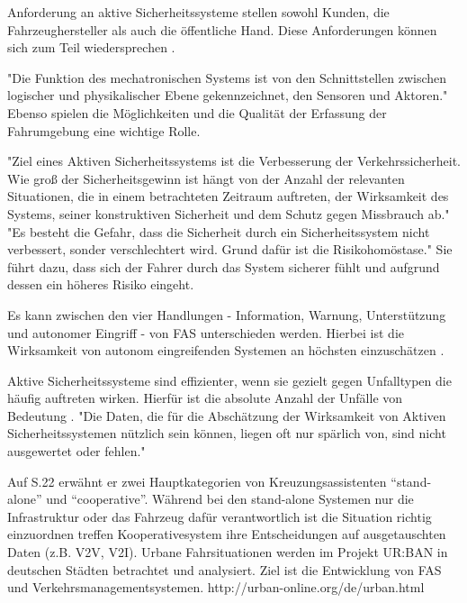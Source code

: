 
Anforderung an aktive Sicherheitssysteme stellen sowohl Kunden, die Fahrzeughersteller als auch die öffentliche Hand. Diese Anforderungen können sich zum Teil wiedersprechen \parencite[S.8]{Meitinger.2008}. %

"Die Funktion des mechatronischen Systems ist von den Schnittstellen zwischen logischer und physikalischer Ebene gekennzeichnet, den Sensoren und Aktoren." \parencite[S.9]{Meitinger.2008} Ebenso spielen die Möglichkeiten und die Qualität der Erfassung der Fahrumgebung eine wichtige Rolle.

"Ziel eines Aktiven Sicherheitssystems ist die Verbesserung der Verkehrssicherheit. Wie groß der Sicherheitsgewinn ist hängt von der Anzahl der relevanten Situationen, die in einem betrachteten Zeitraum auftreten, der Wirksamkeit des Systems, seiner konstruktiven Sicherheit und dem Schutz gegen Missbrauch ab." "Es besteht die Gefahr, dass die Sicherheit durch ein Sicherheitssystem nicht verbessert, sonder verschlechtert wird. Grund dafür ist die Risikohomöstase." Sie führt dazu, dass sich der Fahrer durch das System sicherer fühlt und aufgrund dessen ein höheres Risiko eingeht. \parencite[S.10]{Meitinger.2008}

Es kann zwischen den vier Handlungen - Information, Warnung, Unterstützung und autonomer Eingriff - von FAS unterschieden werden. Hierbei ist die Wirksamkeit von autonom eingreifenden Systemen an höchsten einzuschätzen \parencite[S.11]{Meitinger.2008}.

Aktive Sicherheitssysteme sind effizienter, wenn sie gezielt gegen Unfalltypen die  häufig auftreten wirken. Hierfür ist die absolute Anzahl der Unfälle von Bedeutung \parencite[S.19]{Meitinger.2008}. "Die Daten, die für die Abschätzung der Wirksamkeit von Aktiven Sicherheitssystemen nützlich sein können, liegen oft nur spärlich von, sind nicht ausgewertet oder fehlen." \parencite[S.22]{Meitinger.2008}

Auf S.22 erwähnt er zwei Hauptkategorien von Kreuzungsassistenten \enquote{stand-alone} und \enquote{cooperative}. Während bei den stand-alone Systemen nur die Infrastruktur oder das Fahrzeug dafür verantwortlich ist die Situation richtig einzuordnen treffen Kooperativesystem ihre Entscheidungen auf ausgetauschten Daten (z.B. V2V, V2I).
Urbane Fahrsituationen werden im Projekt UR:BAN in deutschen Städten betrachtet und analysiert. Ziel ist die Entwicklung von FAS und Verkehrsmanagementsystemen. http://urban-online.org/de/urban.html

